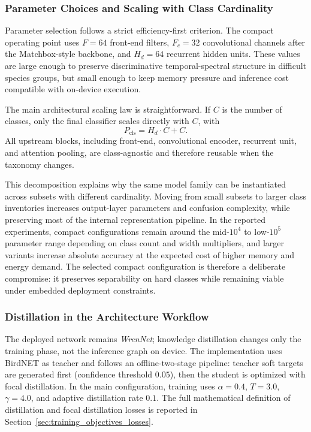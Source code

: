 \documentclass[a4paper,singleside,12pt]{report} %
\begin{document}
	\subsubsection{Parameter Choices and Scaling with Class Cardinality}
	Parameter selection follows a strict efficiency-first criterion. The compact operating point uses \(F=64\) front-end filters, \(F_c=32\) convolutional channels after the Matchbox-style backbone, and \(H_d=64\) recurrent hidden units. These values are large enough to preserve discriminative temporal-spectral structure in difficult species groups, but small enough to keep memory pressure and inference cost compatible with on-device execution.

	The main architectural scaling law is straightforward. If \(C\) is the number of classes, only the final classifier scales directly with \(C\), with
	\begin{equation}
		P_{\mathrm{cls}} = H_d \cdot C + C.
	\end{equation}
	All upstream blocks, including front-end, convolutional encoder, recurrent unit, and attention pooling, are class-agnostic and therefore reusable when the taxonomy changes.

	This decomposition explains why the same model family can be instantiated across subsets with different cardinality. Moving from small subsets to larger class inventories increases output-layer parameters and confusion complexity, while preserving most of the internal representation pipeline. In the reported experiments, compact configurations remain around the mid-\(10^4\) to low-\(10^5\) parameter range depending on class count and width multipliers, and larger variants increase absolute accuracy at the expected cost of higher memory and energy demand. The selected compact configuration is therefore a deliberate compromise: it preserves separability on hard classes while remaining viable under embedded deployment constraints.

	\subsubsection{Distillation in the Architecture Workflow}
	\label{sec:distillation_workflow}
	The deployed network remains \emph{WrenNet}; knowledge distillation changes only the training phase, not the inference graph on device. The implementation uses BirdNET as teacher and follows an offline-two-stage pipeline: teacher soft targets are generated first (confidence threshold \(0.05\)), then the student is optimized with focal distillation. In the main configuration, training uses \(\alpha=0.4\), \(T=3.0\), \(\gamma=4.0\), and adaptive distillation rate \(0.1\). The full mathematical definition of distillation and focal distillation losses is reported in Section~\ref{sec:training_objectives_losses}.
\end{document}
